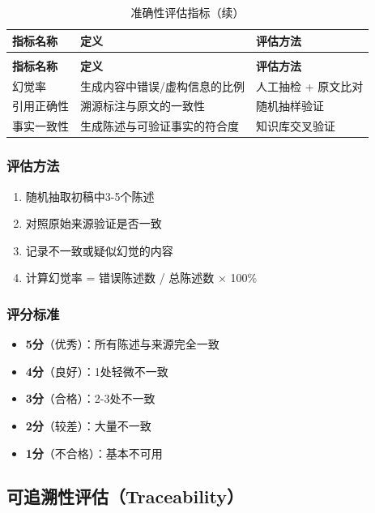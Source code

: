 \documentclass[12pt,a4paper,oneside]{article}
\begin{document}
\begin{longtable}{p{3cm}p{4cm}p{4cm}}
    \caption{准确性评估指标} \\
    \toprule
    \textbf{指标名称} & \textbf{定义} & \textbf{评估方法} \\
    \midrule
    \endfirsthead
    \caption{准确性评估指标（续）} \\
    \toprule
    \textbf{指标名称} & \textbf{定义} & \textbf{评估方法} \\
    \midrule
    \endhead
    幻觉率 & 生成内容中错误/虚构信息的比例 & 人工抽检 + 原文比对 \\
    引用正确性 & 溯源标注与原文的一致性 & 随机抽样验证 \\
    事实一致性 & 生成陈述与可验证事实的符合度 & 知识库交叉验证 \\
    \bottomrule
\end{longtable}

\subsubsection{评估方法}

\begin{enumerate}[\arabic*)]
    \item 随机抽取初稿中3-5个陈述
    \item 对照原始来源验证是否一致
    \item 记录不一致或疑似幻觉的内容
    \item 计算幻觉率 = 错误陈述数 / 总陈述数 × 100\%
\end{enumerate}

\subsubsection{评分标准}

\begin{itemize}
    \item \textbf{5分}（优秀）：所有陈述与来源完全一致
    \item \textbf{4分}（良好）：1处轻微不一致
    \item \textbf{3分}（合格）：2-3处不一致
    \item \textbf{2分}（较差）：大量不一致
    \item \textbf{1分}（不合格）：基本不可用
\end{itemize}

\subsection{可追溯性评估（Traceability）}
\end{document}
